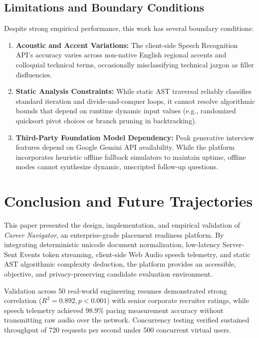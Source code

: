 \documentclass[conference]{IEEEtran}
\begin{document}
\subsection{Limitations and Boundary Conditions}
Despite strong empirical performance, this work has several boundary conditions:
\begin{enumerate}
    \item \textbf{Acoustic and Accent Variations:} The client-side Speech Recognition API's accuracy varies across non-native English regional accents and colloquial technical terms, occasionally misclassifying technical jargon as filler disfluencies.
    \item \textbf{Static Analysis Constraints:} While static AST traversal reliably classifies standard iteration and divide-and-conquer loops, it cannot resolve algorithmic bounds that depend on runtime dynamic input values (e.g., randomized quicksort pivot choices or branch pruning in backtracking).
    \item \textbf{Third-Party Foundation Model Dependency:} Peak generative interview features depend on Google Gemini API availability. While the platform incorporates heuristic offline fallback simulators to maintain uptime, offline modes cannot synthesize dynamic, unscripted follow-up questions.
\end{enumerate}

\section{Conclusion and Future Trajectories}
This paper presented the design, implementation, and empirical validation of \textit{Career Navigator}, an enterprise-grade placement readiness platform. By integrating deterministic unicode document normalization, low-latency Server-Sent Events token streaming, client-side Web Audio speech telemetry, and static AST algorithmic complexity deduction, the platform provides an accessible, objective, and privacy-preserving candidate evaluation environment. 

Validation across 50 real-world engineering resumes demonstrated strong correlation ($R^2 = 0.892, p < 0.001$) with senior corporate recruiter ratings, while speech telemetry achieved 98.9\% pacing measurement accuracy without transmitting raw audio over the network. Concurrency testing verified sustained throughput of 720 requests per second under 500 concurrent virtual users.
\end{document}
